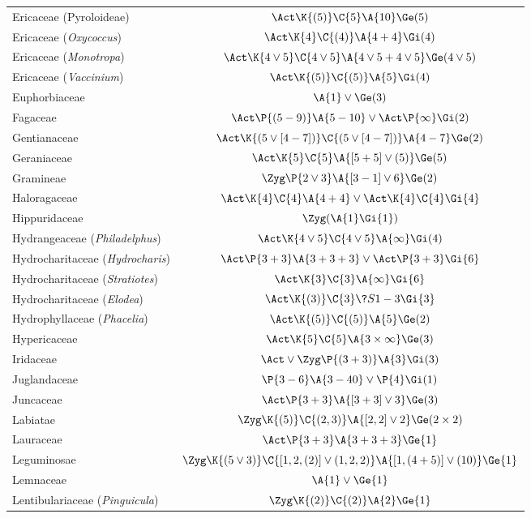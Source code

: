 \documentclass[12pt]{article}
\begin{document}
\begin{longtable}{lc}
Ericaceae (Pyroloideae) & $\Act\K{(5)}\C{5}\A{10}\Ge(5)$\\[2pt]
Ericaceae (\textit{Oxycoccus}) & $\Act\K{4}\C{(4)}\A{4+4}\Gi(4)$\\[2pt]
Ericaceae (\textit{Monotropa}) & $\Act\K{4\vee5}\C{4\vee5}\A{4\vee5+4\vee5}\Ge(4\vee5)$\\[2pt]
Ericaceae (\textit{Vaccinium}) & $\Act\K{(5)}\C{(5)}\A{5}\Gi(4)$\\[2pt]
Euphorbiaceae & $\A{1}\vee\Ge(3)$\\[2pt]
Fagaceae & $\Act\P{(5-9)}\A{5-10}\vee\Act\P{\infty}\Gi(2)$\\[2pt]
Gentianaceae & $\Act\K{(5\vee[4-7])}\C{(5\vee[4-7])}\A{4-7}\Ge(2)$\\[2pt]
Geraniaceae & $\Act\K{5}\C{5}\A{[5+5]\vee(5)}\Ge(5)$\\[2pt]
Gramineae & $\Zyg\P{2\vee3}\A{[3-1]\vee6}\Ge(2)$\\[2pt]
Haloragaceae & $\Act\K{4}\C{4}\A{4+4}\vee\Act\K{4}\C{4}\Gi{4}$\\[2pt]
Hippuridaceae & $\Zyg(\A{1}\Gi{1})$\\[2pt]
Hydrangeaceae (\textit{Philadelphus}) & $\Act\K{4\vee5}\C{4\vee5}\A{\infty}\Gi(4)$\\[2pt]
Hydrocharitaceae (\textit{Hydrocharis}) & $\Act\P{3+3}\A{3+3+3}\vee\Act\P{3+3}\Gi{6}$\\[2pt]
Hydrocharitaceae (\textit{Stratiotes}) & $\Act\K{3}\C{3}\A{\infty}\Gi{6}$\\[2pt]
Hydrocharitaceae (\textit{Elodea}) & $\Act\K{(3)}\C{3}\?{S}{1-3}\Gi{3}$\\[2pt]
Hydrophyllaceae (\textit{Phacelia}) & $\Act\K{(5)}\C{(5)}\A{5}\Ge(2)$\\[2pt]
Hypericaceae & $\Act\K{5}\C{5}\A{3\times\infty}\Ge(3)$\\[2pt]
Iridaceae & $\Act\vee\Zyg\P{(3+3)}\A{3}\Gi(3)$\\[2pt]
Juglandaceae & $\P{3-6}\A{3-40}\vee\P{4}\Gi(1)$\\[2pt]
Juncaceae & $\Act\P{3+3}\A{[3+3]\vee3}\Ge(3)$\\[2pt]
Labiatae & $\Zyg\K{(5)}\C{(2,3)}\A{[2,2]\vee2}\Ge(2\times2)$\\[2pt]
Lauraceae & $\Act\P{3+3}\A{3+3+3}\Ge{1}$\\[2pt]
Leguminosae & $\Zyg\K{(5\vee3)}\C{[1,2,(2)]\vee(1,2,2)}\A{[1,(4+5)]\vee(10)}\Ge{1}$\\[2pt]
Lemnaceae & $\A{1}\vee\Ge{1}$\\[2pt]
Lentibulariaceae (\textit{Pinguicula}) & $\Zyg\K{(2)}\C{(2)}\A{2}\Ge{1}$\\[2pt]

\end{longtable}
\end{document}

